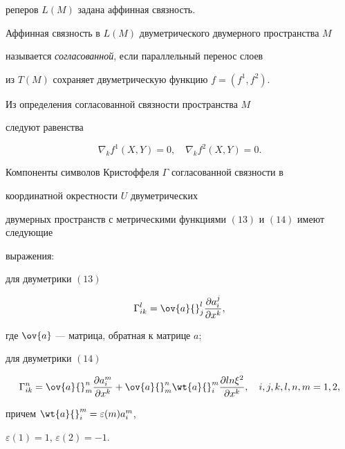 реперов $L(M)$ задана аффинная связность.





Аффинная связность в $L(M)$ двуметрического двумерного пространства $M$ 


называется {\it согласованной}, если параллельный перенос слоев


из $T(M)$ сохраняет двуметрическую функцию $f=(f^1,f^2)$.


Из определения согласованной связности пространства $M$


следуют равенства


\begin{equation}


\nabla_kf^1(X,Y)=0,\quad \nabla_kf^2(X,Y)=0.


\end{equation}








\begin{thm}


Компоненты символов Кристоффеля $\Gamma$ согласованной связности в


координатной окрестности $U$ двуметрических


двумерных пространств с метрическими функциями $(13)$ и $(14)$ имеют следующие


выражения\/${:}$





для двуметрики $(13)$


\begin{equation}


\Gamma^l_{ik}=\ov{a}{}_j^l\frac{\partial a_i^j}{\partial x^k},


\end{equation}


где $\ov{a}$ --- матрица, обратная к матрице $a;$





для двуметрики $(14)$


\begin{equation}


\Gamma^n_{ik}= \ov{a}{}^n_m\frac{\partial a^m_i}{\partial x^k}+


\ov{a}{}^n_m\wt{a}{}^m_i\frac{\partial ln\xi^2}{\partial x^k},\quad


i,j,k,l,n,m=1,2,


\end{equation}


причем $\wt{a}{}^m_i=\varepsilon(m)a^m_i$,


$\varepsilon(1)=1$, $\varepsilon(2)=-1$.


\end{thm}






